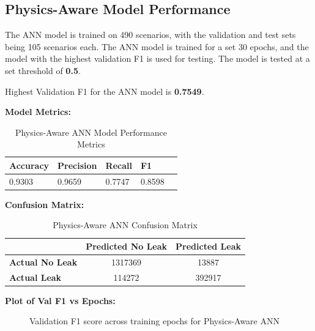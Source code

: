 \documentclass[final,5p,times,twocolumn,authoryear]{elsarticle}
\begin{document}
\subsection{Physics-Aware Model Performance}

The ANN model is trained on 490 scenarios, with the validation and test sets being 105 scenarios each. The ANN model is trained for a set 30 epochs, and the model with the highest validation F1 is used for testing. The model is tested at a set threshold of \textbf{0.5}.

Highest Validation F1 for the ANN model is \textbf{0.7549}.

\vspace{0.03cm}

\textbf{Model Metrics:}

\begin{table}[H]
\centering
\caption{Physics-Aware ANN Model Performance Metrics}
\label{tab:paann_metrics}
\begin{tabular}{@{}lllll@{}}
\toprule
\textbf{Accuracy} & \textbf{Precision} & \textbf{Recall} & \textbf{F1} \\ \midrule
0.9303       & 0.9659        & 0.7747      & 0.8598     \\ \bottomrule
\end{tabular}
\end{table}

\textbf{Confusion Matrix:}

\begin{table}[H]
\centering
\caption{Physics-Aware ANN Confusion Matrix}
\label{tab:conf_matrix_paann}
\begin{tabular}{lcc}
\toprule
 & \textbf{Predicted No Leak} & \textbf{Predicted Leak} \\
\midrule
\textbf{Actual No Leak} & 1317369 & 13887 \\
\textbf{Actual  Leak} & 114272 & 392917 \\
\bottomrule
\end{tabular}
\end{table}

\textbf{Plot of Val F1 vs Epochs:}


\begin{figure}[H]
\centering
{}
\caption{Validation F1 score across training epochs for Physics-Aware ANN}
\label{fig:val_f1_paann}
\end{figure}
\end{document}
